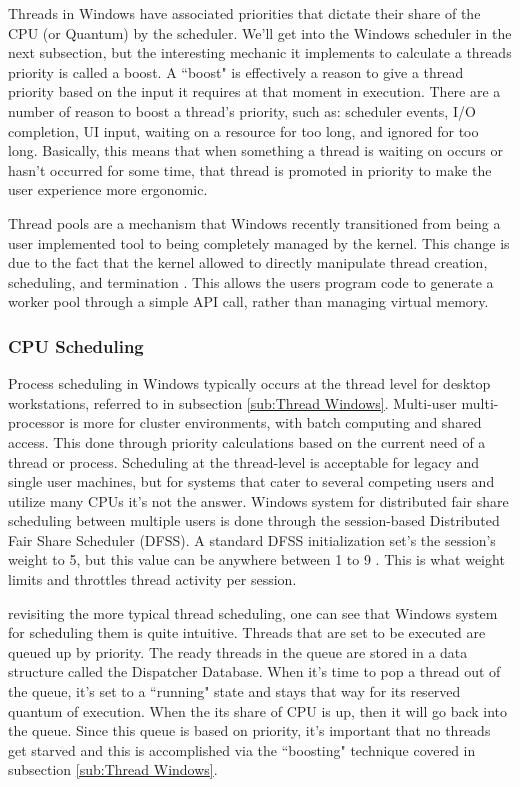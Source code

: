 \documentclass[10pt,draftclsnofoot,onecolumn]{IEEEtran}
\begin{document}
\par Threads in Windows have associated priorities that dictate their share of the CPU (or Quantum) by the scheduler.
We'll get into the Windows scheduler in the next subsection, but the interesting mechanic it implements to calculate a threads priority is called a boost.
A ``boost" is effectively a reason to give a thread priority based on the input it requires at that moment in execution.
There are a number of reason to boost a thread's priority, such as: scheduler events, I/O completion, UI input, waiting on a resource for too long, and ignored for too long.
Basically, this means that when something a thread is waiting on occurs or hasn't occurred for some time, that thread is promoted in priority to make the user experience more ergonomic.

\par Thread pools are a mechanism that Windows recently transitioned from being a user implemented tool to being completely managed by the kernel.
This change is due to the fact that the kernel allowed to directly manipulate thread creation, scheduling, and termination \cite{win:1}.
This allows the users program code to generate a worker pool through a simple API call, rather than managing virtual memory.\\

\subsubsection{CPU Scheduling}
\label{sub:CPU Scheduling Windows}
\par Process scheduling in Windows typically occurs at the thread level for desktop workstations, referred to in subsection \ref{sub:Thread Windows}.
Multi-user multi-processor is more for cluster environments, with batch computing and shared access.
This done through priority calculations based on the current need of a thread or process.
Scheduling at the thread-level is acceptable for legacy and single user machines, but for systems that cater to several competing users and utilize many CPUs it's not the answer.
Windows system for distributed fair share scheduling between multiple users is done through the session-based Distributed Fair Share Scheduler (DFSS).
A standard DFSS initialization set's the session's weight to 5, but this value can be anywhere between 1 to 9 \cite{win:1}.
This is what weight limits and throttles thread activity per session.

\par revisiting the more typical thread scheduling, one can see that Windows system for scheduling them is quite intuitive.
Threads that are set to be executed are queued up by priority.
The ready threads in the queue are stored in a data structure called the Dispatcher Database.
When it's time to pop a thread out of the queue, it's set to a ``running" state and stays that way for its reserved quantum of execution.
When the its share of CPU is up, then it will go back into the queue.
Since this queue is based on priority, it's important that no threads get starved and this is accomplished via the ``boosting" technique covered in subsection \ref{sub:Thread Windows}.\\
\end{document}
